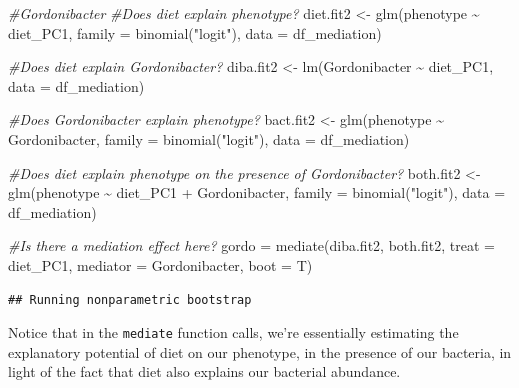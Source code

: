\documentclass[
]{article}
\newenvironment{Shaded}{\begin{snugshade}}{\end{snugshade}}
\newcommand{\AttributeTok}[1]{\textcolor[rgb]{0.77,0.63,0.00}{#1}}
\newcommand{\CommentTok}[1]{\textcolor[rgb]{0.56,0.35,0.01}{\textit{#1}}}
\newcommand{\FunctionTok}[1]{\textcolor[rgb]{0.00,0.00,0.00}{#1}}
\newcommand{\NormalTok}[1]{#1}
\newcommand{\OtherTok}[1]{\textcolor[rgb]{0.56,0.35,0.01}{#1}}
\newcommand{\SpecialCharTok}[1]{\textcolor[rgb]{0.00,0.00,0.00}{#1}}
\newcommand{\StringTok}[1]{\textcolor[rgb]{0.31,0.60,0.02}{#1}}
\begin{document}
\begin{Shaded}
\begin{Highlighting}[]
\CommentTok{\#Gordonibacter}
\CommentTok{\#Does diet explain phenotype?}
\NormalTok{diet.fit2  }\OtherTok{\textless{}{-}} \FunctionTok{glm}\NormalTok{(phenotype }\SpecialCharTok{\textasciitilde{}}\NormalTok{ diet\_PC1, }
                  \AttributeTok{family =} \FunctionTok{binomial}\NormalTok{(}\StringTok{"logit"}\NormalTok{), }\AttributeTok{data =}\NormalTok{ df\_mediation)}

\CommentTok{\#Does diet explain Gordonibacter?}
\NormalTok{diba.fit2  }\OtherTok{\textless{}{-}}  \FunctionTok{lm}\NormalTok{(Gordonibacter }\SpecialCharTok{\textasciitilde{}}\NormalTok{ diet\_PC1, }\AttributeTok{data =}\NormalTok{ df\_mediation)}

\CommentTok{\#Does Gordonibacter explain phenotype?}
\NormalTok{bact.fit2  }\OtherTok{\textless{}{-}}  \FunctionTok{glm}\NormalTok{(phenotype }\SpecialCharTok{\textasciitilde{}}\NormalTok{ Gordonibacter, }
                    \AttributeTok{family =} \FunctionTok{binomial}\NormalTok{(}\StringTok{"logit"}\NormalTok{), }\AttributeTok{data =}\NormalTok{ df\_mediation)}

\CommentTok{\#Does diet explain phenotype on the presence of Gordonibacter?}
\NormalTok{both.fit2  }\OtherTok{\textless{}{-}} \FunctionTok{glm}\NormalTok{(phenotype }\SpecialCharTok{\textasciitilde{}}\NormalTok{ diet\_PC1 }\SpecialCharTok{+}\NormalTok{ Gordonibacter, }
                  \AttributeTok{family =} \FunctionTok{binomial}\NormalTok{(}\StringTok{"logit"}\NormalTok{), }\AttributeTok{data =}\NormalTok{ df\_mediation)}

\CommentTok{\#Is there a mediation effect here?}
\NormalTok{gordo }\OtherTok{=} \FunctionTok{mediate}\NormalTok{(diba.fit2, both.fit2, }
                \AttributeTok{treat =} \StringTok{\textquotesingle{}diet\_PC1\textquotesingle{}}\NormalTok{, }\AttributeTok{mediator =} \StringTok{\textquotesingle{}Gordonibacter\textquotesingle{}}\NormalTok{, }\AttributeTok{boot =}\NormalTok{ T)}
\end{Highlighting}
\end{Shaded}

\begin{verbatim}
## Running nonparametric bootstrap
\end{verbatim}

Notice that in the \texttt{mediate} function calls, we're essentially
estimating the explanatory potential of diet on our phenotype, in the
presence of our bacteria, in light of the fact that diet also explains
our bacterial abundance.
\end{document}
